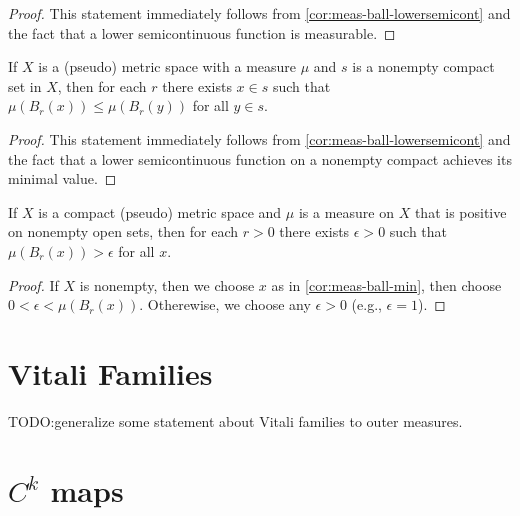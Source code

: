 \begin{proof}
  This statement immediately follows from \autoref{cor:meas-ball-lowersemicont}
  and the fact that a lower semicontinuous function is measurable.
\end{proof}

\begin{corollary}%
  \label{cor:meas-ball-min}
  If \(X\) is a (pseudo) metric space with a measure \(\mu\)
  and \(s\) is a nonempty compact set in \(X\),
  then for each \(r\) there exists \(x \in s\) such that \(\mu(B_{r}(x)) \le \mu(B_{r}(y))\) for all \(y \in s\).
\end{corollary}

\begin{proof}
  This statement immediately follows from \autoref{cor:meas-ball-lowersemicont}
  and the fact that a lower semicontinuous function on a nonempty compact
  achieves its minimal value.
\end{proof}

\begin{corollary}%
  \label{cor:meas-ball-gt-pos}
  If \(X\) is a compact (pseudo) metric space
  and \(\mu\) is a measure on \(X\) that is positive on nonempty open sets,
  then for each \(r > 0\) there exists \(\epsilon>0\)
  such that \(\mu(B_{r}(x))>\epsilon\) for all \(x\).
\end{corollary}

\begin{proof}
  If \(X\) is nonempty, then we choose \(x\) as in \autoref{cor:meas-ball-min},
  then choose \(0 < \epsilon < \mu(B_{r}(x))\).
  Otherewise, we choose any \(\epsilon > 0\) (e.g., \(\epsilon = 1\)).
\end{proof}


\section{Vitali Families}%
\label{sec:vitali-families}

TODO:\@ generalize some statement about Vitali families to outer measures.

\section{\(C^k\) maps}%
\label{sec:ck-maps}

